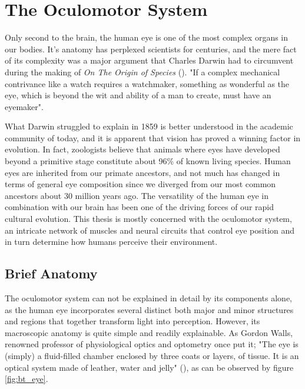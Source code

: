 \section{The Oculomotor System} \label{sec:bt_TheOculomotorSystem}

Only second to the brain, the human eye is one of the most complex organs in our bodies. It's anatomy has perplexed scientists for centuries, and the mere fact of its complexity was a major argument that Charles Darwin had to circumvent during the making of \textit{On The  Origin of Species} (\cite{oyster1999}). "If a complex mechanical contrivance like a watch requires a watchmaker, something as wonderful as the eye, which is beyond the wit and ability of a man to create, must have an eyemaker". 

What Darwin struggled to explain in 1859 is better understood in the academic community of today, and it is apparent that vision has proved a winning factor in evolution. In fact, zoologists believe that animals where eyes have developed beyond a primitive stage constitute about 96\% of known living species. Human eyes are inherited from our primate ancestors, and not much has changed in terms of general eye composition since we diverged from our most common ancestors about 30 million years ago. The versatility of the human eye in combination with our brain has been one of the driving forces of our rapid cultural evolution. This thesis is mostly concerned with the oculomotor system, an intricate network of muscles and neural circuits that control eye position and in turn determine how humans perceive their environment.

\subsection{Brief Anatomy}
The oculomotor system can not be explained in detail by its components alone, as the human eye incorporates several distinct both major and minor structures and regions that together transform light into perception. However, its macroscopic anatomy is quite simple and readily explainable. As Gordon Walls, renowned professor of physiological optics and optometry once put it; "The eye is (simply) a fluid-filled chamber enclosed by three coats or layers, of tissue. It is an optical system made of leather, water and jelly" (\cite{oyster1999}), as can be observed by figure \ref{fig:bt_eye}.

